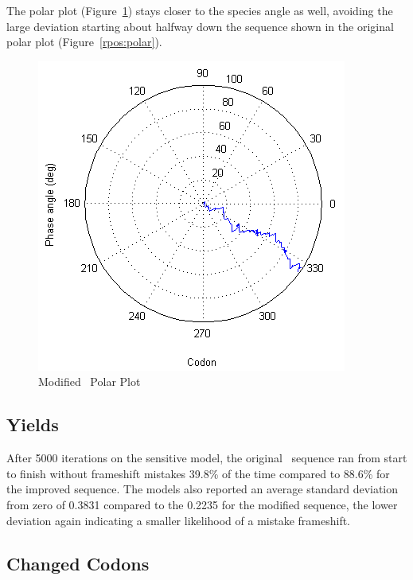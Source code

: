 \documentclass[10pt,twocolumn]{article}
\begin{document}
The polar plot (Figure~\ref{rposmax:polar}) stays closer to the species angle as well,  
avoiding the large deviation starting about halfway down the sequence shown in the original polar plot (Figure~\ref{rpos:polar}).

\begin{figure}[htp]
    \centering
    \caption{Modified \rpoS\ Polar Plot}
    \label{rposmax:polar}
    \includegraphics[scale=0.7]{rpoS/max-polar.png}
\end{figure}

\subsection{Yields}

After 5000 iterations on the sensitive model, the original \rpoS\ sequence
ran from start to finish without frameshift mistakes 39.8\% of the time compared to
88.6\% for the improved sequence. The models also reported an average standard deviation from zero of
0.3831 compared to the 0.2235 for the modified sequence, the lower deviation again
indicating a smaller likelihood of a mistake frameshift.

\subsection{Changed Codons}
\end{document}
